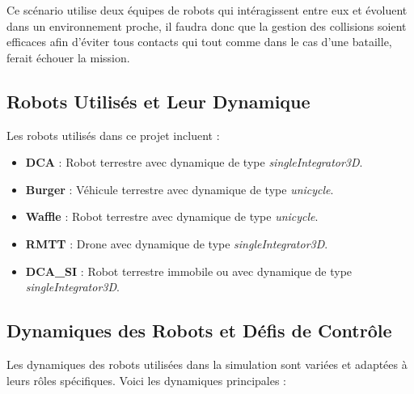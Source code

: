 \documentclass[a4paper,12pt]{article}
\begin{document}
Ce scénario utilise deux équipes de robots qui intéragissent entre eux et évoluent dans un environnement proche, il faudra donc que la gestion des collisions soient efficaces afin d'éviter tous contacts qui tout comme dans le cas d'une bataille, ferait échouer la mission.

\subsection*{Robots Utilisés et Leur Dynamique}
Les robots utilisés dans ce projet incluent :
\begin{itemize}
    \item \textbf{DCA} : Robot terrestre avec dynamique de type \textit{singleIntegrator3D}.
    \item \textbf{Burger} : Véhicule terrestre avec dynamique de type \textit{unicycle}.
    \item \textbf{Waffle} : Robot terrestre avec dynamique de type \textit{unicycle}.
    \item \textbf{RMTT} : Drone avec dynamique de type \textit{singleIntegrator3D}.
    \item \textbf{DCA\_SI} : Robot terrestre immobile ou avec dynamique de type \textit{singleIntegrator3D}.
\end{itemize}

\subsection*{Dynamiques des Robots et Défis de Contrôle}
Les dynamiques des robots utilisées dans la simulation sont variées et adaptées à leurs rôles spécifiques. Voici les dynamiques principales :
\end{document}
